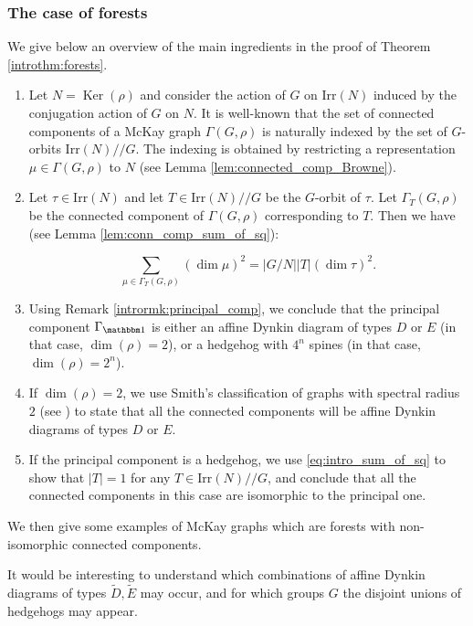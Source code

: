\documentclass[ALCO]{cedram}
\newcommand{\triv}{{\mathbbm 1}}
\newcommand{\Ker}{\operatorname{Ker}}
\begin{document}
\subsubsection{The case of forests}
{We give below an overview of the main ingredients in the proof of Theorem \ref{introthm:forests}.}
{
\begin{enumerate}[label=(\alph*)]
    \item Let $N=\Ker(\rho)$ and consider the action of $G$ on $\mathrm{Irr}(N)$ induced by the conjugation action of $G$ on $N$. It is well-known that the set of connected components of a McKay graph $\Gamma(G,\rho)$ is naturally indexed by the set of $G$-orbits $\mathrm{Irr}(N)//G$. The indexing is obtained by restricting a representation $\mu\in  \Gamma(G,\rho)$ to $N$ (see Lemma \ref{lem:connected_comp_Browne}).
    \item Let $\tau\in \mathrm{Irr}(N)$ and let $T\in \mathrm{Irr}(N)//G$ be the $G$-orbit of $\tau$. Let $\Gamma_T(G,\rho)$ be the connected component of $\Gamma(G,\rho)$ corresponding to $T$. Then we have (see Lemma \ref{lem:conn_comp_sum_of_sq}):
    
    \begin{equation}\label{eq:intro_sum_of_sq}
     \sum_{\mu\in \Gamma_T(G,\rho)} (\dim \mu)^2=|G/N||T|(\dim\tau)^2.
    \end{equation}
\item Using Remark \ref{intrormk:principal_comp}, we conclude that the principal component $\Gamma_\triv$ is either an affine Dynkin diagram of types $D$ or $E$ (in that case, $\dim(\rho)=2$), or a hedgehog with $4^n$ spines (in that case, $\dim(\rho)=2^n$). 
\item If $\dim(\rho)=2$, we use {Smith's} classification of graphs with spectral radius $2$ (see \cite{Smith}) to state that all the connected components will be affine Dynkin diagrams of types $D$ or $E$.
\item If the principal component is a hedgehog, we use  \eqref{eq:intro_sum_of_sq} to show that $|T|=1$ for any $T\in \mathrm{Irr}(N)//G$, and conclude that all the connected components in this case are isomorphic to the principal one.
\end{enumerate}
}
We then give some examples of McKay graphs which are forests with non-isomorphic connected components. 

{It would be interesting to understand which combinations of affine Dynkin diagrams of types $\tilde{D}, \tilde{E}$ may occur, and for which groups $G$ the disjoint unions of hedgehogs may appear.}
\end{document}
